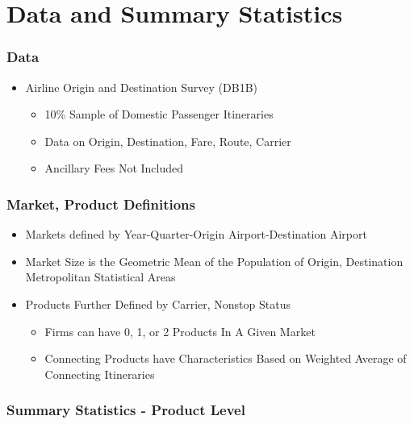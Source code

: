\documentclass[xcolor=dvipsnames]{beamer}
\begin{document}
    \section{Data and Summary Statistics}

    \begin{frame}
		\frametitle{Data}
		\begin{itemize}
			\item Airline Origin and Destination Survey (DB1B)
			\begin{itemize}
				\item 10\% Sample of Domestic Passenger Itineraries 
				\item Data on Origin, Destination, Fare, Route, Carrier
                \item Ancillary Fees Not Included 
			\end{itemize}
		\end{itemize}
	\end{frame}


    \begin{frame}
        \frametitle{Market, Product Definitions}
        \begin{itemize}
        	\item Markets defined by Year-Quarter-Origin Airport-Destination Airport 
			\item Market Size is the Geometric Mean of the Population of Origin, Destination Metropolitan Statistical Areas
			\item Products Further Defined by Carrier, Nonstop Status
            \begin{itemize}
                \item Firms can have 0, 1, or 2 Products In A Given Market
                \item Connecting Products have Characteristics Based on Weighted Average of Connecting Itineraries
            \end{itemize}
        \end{itemize}
    \end{frame}

      \begin{frame}
        \frametitle{Summary Statistics - Product Level}
        \resizebox{\linewidth}{!}{%
\begin{tabular}[t]{lllllll}
\toprule
\multicolumn{1}{c}{ } & \multicolumn{2}{c}{Pre-Pandemic} & \multicolumn{2}{c}{Post-Pandemic} & \multicolumn{2}{c}{ } \\
\cmidrule(l{3pt}r{3pt}){2-3} \cmidrule(l{3pt}r{3pt}){4-5}
 & Mean & (SD) & Mean & (SD) & Change & t-Statistic\\
\midrule
Price (2017 USD) & 233.37 & (68.47) & 212.77 & (75.21) & -20.6 & 107.74***\\
Passengers & 4248.33 & (10185.27) & 3531.43 & (8648.27) & -716.9 & 28.81***\\
Distance (1000s) & 1.41 & (0.67) & 1.41 & (0.67) & 0 & -0.11\\
Extra Distance & 0.13 & (0.18) & 0.14 & (0.19) & 0.01 & -12.61***\\
Observations & 307849 &  & 265196 &  &  & \\
\bottomrule
\end{tabular}
}
    \end{frame}
\end{document}
